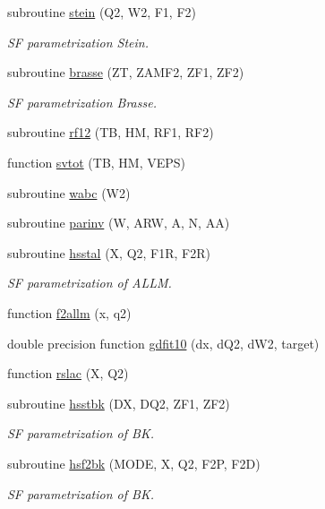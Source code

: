 \begin{DoxyCompactItemize}
subroutine \hyperlink{djangoh__h_8f_a4e8ef86cfe2f5d96120574725e66a516}{stein} (Q2, W2, F1, F2)
\begin{DoxyCompactList}\small\item\em SF parametrization Stein. \end{DoxyCompactList}\item 
subroutine \hyperlink{djangoh__h_8f_a82cd345d495397e5870ba03c6ff3662c}{brasse} (ZT, Z\+A\+M\+F2, Z\+F1, Z\+F2)
\begin{DoxyCompactList}\small\item\em SF parametrization Brasse. \end{DoxyCompactList}\item 
subroutine \hyperlink{djangoh__h_8f_adc612a6379fe2bea9d4fc9539ea755fc}{rf12} (TB, HM, R\+F1, R\+F2)
\item 
function \hyperlink{djangoh__h_8f_a09c6d9f465f6389f731d46e6f94caae9}{svtot} (TB, HM, V\+E\+PS)
\item 
subroutine \hyperlink{djangoh__h_8f_a839e45a495af80840dd32630754982cf}{wabc} (W2)
\item 
subroutine \hyperlink{djangoh__h_8f_a425ded79ad99819b2a6ccace0358a5ef}{parinv} (W, A\+RW, A, N, AA)
\item 
subroutine \hyperlink{djangoh__h_8f_aee7150f7f29148fca4b6631da45d4ece}{hsstal} (X, Q2, F1R, F2R)
\begin{DoxyCompactList}\small\item\em SF parametrization of A\+L\+LM. \end{DoxyCompactList}\item 
function \hyperlink{djangoh__h_8f_a1e585c73c2d45b50e390fbb6017e4668}{f2allm} (x, q2)
\item 
double precision function \hyperlink{djangoh__h_8f_aafdf2f8800c083262ef67339d17cf775}{gdfit10} (dx, d\+Q2, d\+W2, target)
\item 
function \hyperlink{djangoh__h_8f_aec68a28f044866c5570d11fc901c39f0}{rslac} (X, Q2)
\item 
subroutine \hyperlink{djangoh__h_8f_a82484cffd3d01a73064fd4603cfdd465}{hsstbk} (DX, D\+Q2, Z\+F1, Z\+F2)
\begin{DoxyCompactList}\small\item\em SF parametrization of BK. \end{DoxyCompactList}\item 
subroutine \hyperlink{djangoh__h_8f_aca1a6c7455871ef113e38e782a2cb561}{hsf2bk} (M\+O\+DE, X, Q2, F2P, F2D)
\begin{DoxyCompactList}\small\item\em SF parametrization of BK. \end{DoxyCompactList}\item 

\end{DoxyCompactItemize}
